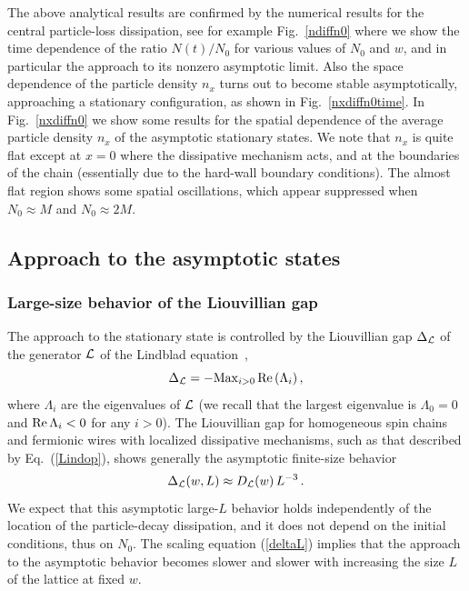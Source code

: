   
  The above analytical results are confirmed by the numerical results
  for the central particle-loss dissipation, see for example
  Fig.~\ref{ndiffn0} where we show the time dependence of the ratio
  $N(t)/N_0$ for various values of $N_0$ and $w$, and in particular the
  approach to its nonzero asymptotic limit. Also the space dependence of
  the particle density $n_x$ turns out to become stable asymptotically,
  approaching a stationary configuration, as shown in
  Fig.~\ref{nxdiffn0time}.  In Fig.~\ref{nxdiffn0} we show some results
  for the spatial dependence of the average particle density $n_x$ of
  the asymptotic stationary states. We note that $n_x$ is quite flat
  except at $x=0$ where the dissipative mechanism acts, and at the
  boundaries of the chain (essentially due to the hard-wall boundary
  conditions). The almost flat region shows some spatial oscillations,
  which appear suppressed when $N_0\approx M$ and $N_0\approx 2M$.
  
  
  \subsection{Approach to the asymptotic states}
  \label{asyappro}
  
  
  \subsubsection{Large-size behavior of the Liouvillian gap}
  \label{liogap}
  
  
  
  The approach to the stationary state is controlled by the Liouvillian
  gap $\Delta_{\cal L}$ of the generator ${\cal L}$ of the Lindblad
  equation~\cite{BP-openquantumsystembook,RH-book,Z-2015-relaxtimes,MBBC-18,KS-2020-boundarydephasing},
  \begin{equation}
  \Delta_{\cal L} = - {\rm Max}_{i>0} \, {\rm Re}\,(\Lambda_i)\,,
  \label{deltadeb}
  \end{equation}
  where $\Lambda_i$ are the eigenvalues of ${\cal L}$ (we recall that
  the largest eigenvalue is $\Lambda_0=0$ and ${\rm Re} \,\Lambda_i<0$
  for any $i>0$).  The Liouvillian gap for homogeneous spin chains and
  fermionic wires with localized dissipative mechanisms, such as that
  described by Eq.~(\ref{Lindop}), shows generally the asymptotic
  finite-size
  behavior~\cite{PP-08,P-2008-thirdquantization,Z-2015-relaxtimes,KS-2020-boundarydephasing,TV-2021-dissipativeboundaries}
  \begin{equation}
  \Delta_{\cal L}(w,L)\approx D_{\cal L}(w) \,L^{-3}\,.  
  \label{deltaL}
  \end{equation}
  We expect that this asymptotic large-$L$ behavior holds independently
  of the location of the particle-decay dissipation, and it does not
  depend on the initial conditions, thus on $N_0$.  The scaling equation
  (\ref{deltaL}) implies that the approach to the asymptotic behavior
  becomes slower and slower with increasing the size $L$ of the lattice
  at fixed $w$.
  
